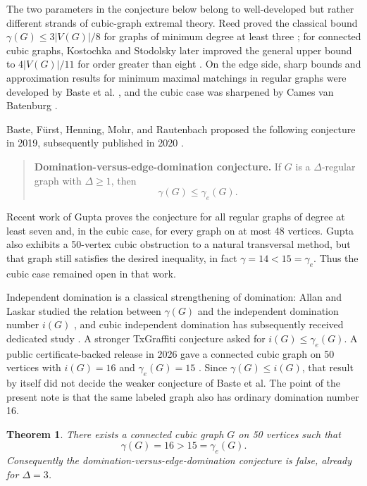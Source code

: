 \documentclass[11pt]{article}
\newtheorem{theorem}{Theorem}
\theoremstyle{definition}
\theoremstyle{remark}
\begin{document}
The two parameters in the conjecture below belong to well-developed but rather different strands of cubic-graph extremal theory.  Reed proved the classical bound $\gamma(G)\le 3|V(G)|/8$ for graphs of minimum degree at least three \cite{Reed1996}; for connected cubic graphs, Kostochka and Stodolsky later improved the general upper bound to $4|V(G)|/11$ for order greater than eight \cite{KostochkaStodolsky2009}.  On the edge side, sharp bounds and approximation results for minimum maximal matchings in regular graphs were developed by Baste et al. \cite{BasteRegular2021}, and the cubic case was sharpened by Cames van Batenburg \cite{Cames2022}.

Baste, F\"urst, Henning, Mohr, and Rautenbach proposed the following conjecture in 2019, subsequently published in 2020 \cite{Baste2020}.

\begin{quote}
\textbf{Domination-versus-edge-domination conjecture.}
If \(G\) is a \(\Delta\)-regular graph with \(\Delta\geq1\), then
\[
\gamma(G)\leq\gamma_e(G).
\]
\end{quote}

Recent work of Gupta \cite{Gupta2026} proves the conjecture for all regular graphs of degree at least seven and, in the cubic case, for every graph on at most 48 vertices.  Gupta also exhibits a 50-vertex cubic obstruction to a natural transversal method, but that graph still satisfies the desired inequality, in fact \(\gamma=14<15=\gamma_e\).  Thus the cubic case remained open in that work.

Independent domination is a classical strengthening of domination: Allan and Laskar studied the relation between $\gamma(G)$ and the independent domination number $i(G)$ \cite{AllanLaskar1978}, and cubic independent domination has subsequently received dedicated study \cite{DorbecEtAl2015}.  A stronger TxGraffiti conjecture asked for $i(G)\leq\gamma_e(G)$.  A public certificate-backed release in 2026 gave a connected cubic graph on 50 vertices with $i(G)=16$ and $\gamma_e(G)=15$ \cite{TxGraffiti2026}.  Since $\gamma(G)\leq i(G)$, that result by itself did not decide the weaker conjecture of Baste et al.  The point of the present note is that the same labeled graph also has ordinary domination number 16.

\begin{theorem}\label{thm:main}
There exists a connected cubic graph \(G\) on 50 vertices such that
\[
\boxed{\gamma(G)=16>15=\gamma_e(G).}
\]
Consequently the domination-versus-edge-domination conjecture is false, already for \(\Delta=3\).
\end{theorem}
\end{document}
